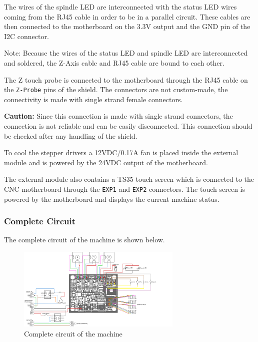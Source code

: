 \documentclass[11pt, openright]{book}
\begin{document}
    The wires of the spindle LED are interconnected with the status LED wires coming from the RJ45 cable in order to be in a parallel circuit. These cables are then connected to the motherboard on the 3.3V output and the GND pin of the I2C connector. 
     \begin{dent}{Note:}
        Because the wires of the status LED and spindle LED are interconnected and soldered, the Z-Axis cable and RJ45 cable are bound to each other.
    \end{dent}
    \vspace{5pt}

    The Z touch probe is connected to the motherboard through the RJ45 cable on the \texttt{Z-Probe} pins of the shield. The connectors are not custom-made, the connectivity is made with single strand female connectors.
     \begin{dent}{\textbf{Caution:}}
        Since this connection is made with single strand connectors, the connection is not reliable and can be easily disconnected. This connection should be checked after any handling of the shield.
    \end{dent}
    \vspace{5pt}

    To cool the stepper drivers a 12VDC/0.17A fan is placed inside the external module and is powered by the 24VDC output of the motherboard.

    The external module also contains a TS35 touch screen which is connected to the CNC motherboard through the \texttt{EXP1} and \texttt{EXP2} connectors. The touch screen is powered by the motherboard and displays the current machine status.


     \subsubsection{Complete Circuit}

        The complete circuit of the machine is shown below.

        \begin{figure}[ht!]
            \centering
            \includegraphics[angle=90, width=0.7\textwidth]{./includes/schema_global.png}
            \caption{Complete circuit of the machine}
        \end{figure}
\end{document}
